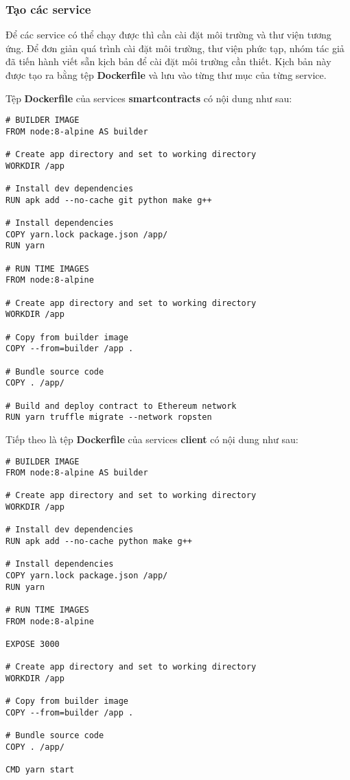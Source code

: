 \documentclass[../main-report.tex]{subfiles}
\begin{document}
\subsubsection{Tạo các service}
\label{sec:build-service}
Để các service có thể chạy được thì cần cài đặt môi trường và thư viện tương ứng. Để đơn giản quá trình cài đặt môi trường, thư viện phức tạp, nhóm tác giả đã tiến hành viết sẵn kịch bản để cài đặt môi trường cần thiết. Kịch bản này được tạo ra bằng tệp \textbf{Dockerfile} và lưu vào từng thư mục của từng service.

Tệp \textbf{Dockerfile} của services \textbf{smartcontracts} có nội dung như sau:

\begin{lstlisting}
# BUILDER IMAGE
FROM node:8-alpine AS builder

# Create app directory and set to working directory
WORKDIR /app

# Install dev dependencies
RUN apk add --no-cache git python make g++

# Install dependencies
COPY yarn.lock package.json /app/
RUN yarn

# RUN TIME IMAGES
FROM node:8-alpine

# Create app directory and set to working directory
WORKDIR /app

# Copy from builder image
COPY --from=builder /app .

# Bundle source code
COPY . /app/

# Build and deploy contract to Ethereum network
RUN yarn truffle migrate --network ropsten
\end{lstlisting}

Tiếp theo là tệp \textbf{Dockerfile} của services \textbf{client} có nội dung như sau:

\begin{lstlisting}
# BUILDER IMAGE
FROM node:8-alpine AS builder

# Create app directory and set to working directory
WORKDIR /app

# Install dev dependencies
RUN apk add --no-cache python make g++

# Install dependencies
COPY yarn.lock package.json /app/
RUN yarn

# RUN TIME IMAGES
FROM node:8-alpine

EXPOSE 3000

# Create app directory and set to working directory
WORKDIR /app

# Copy from builder image
COPY --from=builder /app .

# Bundle source code
COPY . /app/

CMD yarn start
\end{lstlisting}
\end{document}
